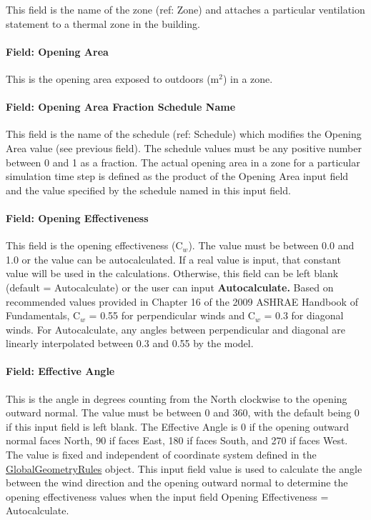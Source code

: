 This field is the name of the zone (ref: Zone) and attaches a particular ventilation statement to a thermal zone in the building.

\paragraph{Field: Opening Area}\label{field-opening-area}

This is the opening area exposed to outdoors (m\(^{2}\)) in a zone.

\paragraph{Field: Opening Area Fraction Schedule Name}\label{field-opening-area-fraction-schedule-name}

This field is the name of the schedule (ref: Schedule) which modifies the Opening Area value (see previous field). The schedule values must be any positive number between 0 and 1 as a fraction. The actual opening area in a zone for a particular simulation time step is defined as the product of the Opening Area input field and the value specified by the schedule named in this input field.

\paragraph{Field: Opening Effectiveness}\label{field-opening-effectiveness}

This field is the opening effectiveness (C\(_{w}\)). The value must be between 0.0 and 1.0 or the value can be autocalculated. If a real value is input, that constant value will be used in the calculations. Otherwise, this field can be left blank (default = Autocalculate) or the user can input \textbf{Autocalculate.} Based on recommended values provided in Chapter 16 of the 2009 ASHRAE Handbook of Fundamentals, C\(_{w}\) = 0.55 for perpendicular winds and C\(_{w}\) = 0.3 for diagonal winds. For Autocalculate, any angles between perpendicular and diagonal are linearly interpolated between 0.3 and 0.55 by the model.

\paragraph{Field: Effective Angle}\label{field-effective-angle}

This is the angle in degrees counting from the North clockwise to the opening outward normal. The value must be between 0 and 360, with the default being 0 if this input field is left blank. The Effective Angle is 0 if the opening outward normal faces North, 90 if faces East, 180 if faces South, and 270 if faces West. The value is fixed and independent of coordinate system defined in the \hyperref[globalgeometryrules]{GlobalGeometryRules} object. This input field value is used to calculate the angle between the wind direction and the opening outward normal to determine the opening effectiveness values when the input field Opening Effectiveness = Autocalculate.

